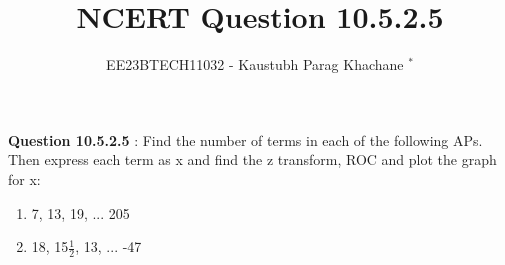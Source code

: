 \documentclass[journal,12pt,twocolumn]{IEEEtran}
\theoremstyle{remark}
\begin{document}

\vspace{3cm}

\Large\title{NCERT Question 10.5.2.5}
\large\author{EE23BTECH11032 - Kaustubh Parag Khachane $^{*}$%
}
\maketitle
\newpage
\bigskip

\renewcommand{\thefigure}{\theenumi}
\renewcommand{\thetable}{\theenumi}
\large\textbf{Question 10.5.2.5} : \normalsize Find the number of terms in each of the following APs. Then express each term as x and find the z transform, ROC and plot the graph for x: 
\begin{enumerate}
    \item 7, 13, 19, ... 205

    \item 18, 15$\frac{1}{2}$, 13, ... -47
\end{enumerate}


\solution
\end{document}

